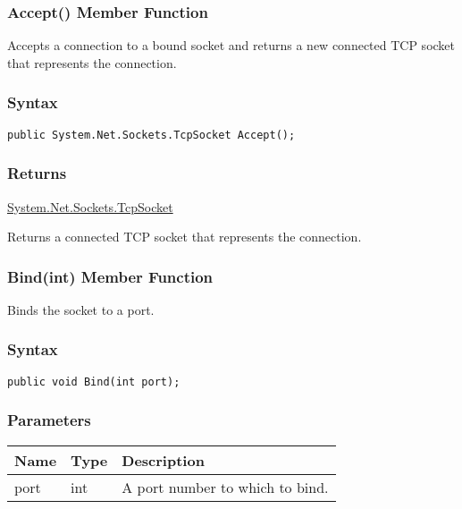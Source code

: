 \documentclass[a4paper,oneside,11.000000pt]{book}
\begin{document}
\hypertarget{System.Net.Sockets.TcpSocket.Accept.P.System.Net.Sockets.TcpSocket}{\subsubsection*{Accept() Member Function}}
\begin{flushleft}
Accepts a connection to a bound socket and returns a new connected TCP socket that represents the connection.

\end{flushleft}
\subsubsection*{Syntax}\texttt{public System.Net.Sockets.TcpSocket Accept();}

\subsubsection*{Returns}\hyperlink{System.Net.Sockets.TcpSocket}{System.\-Net.\-Sockets.\-TcpSocket}
\begin{flushleft}
Returns a connected TCP socket that represents the connection.

\end{flushleft}
\clearpage

\hypertarget{System.Net.Sockets.TcpSocket.Bind.P.System.Net.Sockets.TcpSocket.int}{\subsubsection*{Bind(int) Member Function}}\begin{flushleft}
Binds the socket to a port.

\end{flushleft}

\subsubsection*{Syntax}\texttt{public void Bind(int port);}
\subsubsection*{Parameters}
\begin{flushleft}
\begin{supertabular}[l]{lll}
\textbf{Name}
& \textbf{Type}
& \textbf{Description}
\\
\hline
port
& int
& A port number to which to bind.

\\
\end{supertabular}

\end{flushleft}
\clearpage
\end{document}
